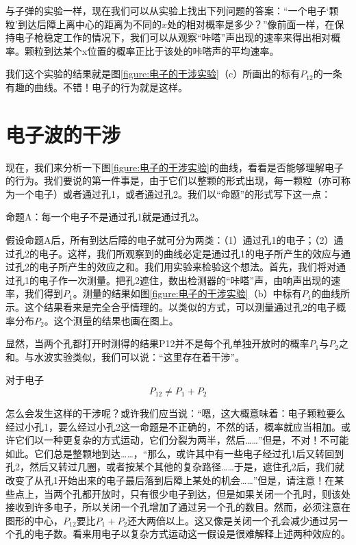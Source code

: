 与子弹的实验一样，现在我们可以从实验上找出下列问题的答案：“一个电子‘颗粒’到达后障上离中心的距离为不同的$x$处的相对概率是多少？”像前面一样，在保持电子枪稳定工作的情况下，我们可以从观察“咔嗒”声出现的速率来得出相对概率。颗粒到达某个x位置的概率正比于该处的咔嗒声的平均速率。

我们这个实验的结果就是图\ref{figure:电子的干涉实验}（c）所画出的标有$P_{12}$的一条有趣的曲线。不错！电子的行为就是这样。

\section{电子波的干涉}

现在，我们来分析一下图\ref{figure:电子的干涉实验}的曲线，看看是否能够理解电子的行为。我们要说的第一件事是，由于它们以整颗的形式出现，每一颗粒（亦可称为一个电子）或者通过孔1，或者通过孔2。我们以“命题”的形式写下这一点：

命题A：每一个电子不是通过孔1就是通过孔2。

假设命题A后，所有到达后障的电子就可分为两类：（1）通过孔1的电子；（2）通过孔2的电子。这样，我们所观察到的曲线必定是通过孔1的电子所产生的效应与通过孔2的电子所产生的效应之和。我们用实验来检验这个想法。首先，我们将对通过孔1的电子作一次测量。把孔2遮住，数出检测器的“咔嗒”声，由响声出现的速率，我们得到$P_1$。测量的结果如图\ref{figure:电子的干涉实验}（b）中标有$P_1$的曲线所示。这个结果看来是完全合乎情理的。以类似的方式，可以测量通过孔2的电子概率分布$P_2$。这个测量的结果也画在图上。

显然，当两个孔都打开时测得的结果P12并不是每个孔单独开放时的概率$P_1$与$P_2$之和。与水波实验类似，我们可以说：“这里存在着干涉”。

对于电子
\begin{equation}
    \label{Eq:I:37:5}
    P_{12} \neq P_1 + P_2
\end{equation}

怎么会发生这样的干涉呢？或许我们应当说：“嗯，这大概意味着：电子颗粒要么经过小孔1，要么经过小孔2这一命题是不正确的，不然的话，概率就应当相加。或许它们以一种更复杂的方式运动，它们分裂为两半，然后……”但是，不对！不可能如此。它们总是整颗地到达……，“那么，或许其中有一些电子经过孔1后又转回到孔2，然后又转过几圈，或者按某个其他的复杂路径……于是，遮住孔2后，我们就改变了从孔1开始出来的电子最后落到后障上某处的机会……”但是，请注意！在某些点上，当两个孔都开放时，只有很少电子到达，但是如果关闭一个孔时，则该处接收到许多电子，所以关闭一个孔增加了通过另一个孔的数目。然而，必须注意在图形的中心，$P_{12}$要比$P_1+P_2$还大两倍以上。这又像是关闭一个孔会减少通过另一个孔的电子数。看来用电子以复杂方式运动这一假设是很难解释上述两种效应的。

